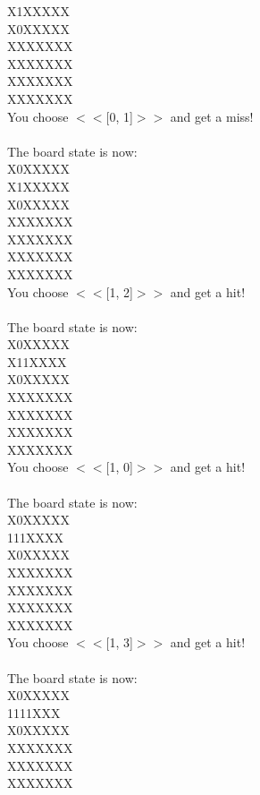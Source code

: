 \documentclass[pdflatex,sn-nature]{sn-jnl}%
\theoremstyle{thmstyleone}%
\theoremstyle{thmstyletwo}%
\theoremstyle{thmstylethree}%
\begin{document}
X1XXXXX $~$\\ 
X0XXXXX $~$\\ 
XXXXXXX $~$\\ 
XXXXXXX $~$\\ 
XXXXXXX $~$\\ 
XXXXXXX $~$\\ 
You choose $<<$[0, 1]$>>$ and get a miss! $~$\\ 
 $~$\\ 
The board state is now: $~$\\ 
X0XXXXX $~$\\ 
X1XXXXX $~$\\ 
X0XXXXX $~$\\ 
XXXXXXX $~$\\ 
XXXXXXX $~$\\ 
XXXXXXX $~$\\ 
XXXXXXX $~$\\ 
You choose $<<$[1, 2]$>>$ and get a hit! $~$\\ 
 $~$\\ 
The board state is now: $~$\\ 
X0XXXXX $~$\\ 
X11XXXX $~$\\ 
X0XXXXX $~$\\ 
XXXXXXX $~$\\ 
XXXXXXX $~$\\ 
XXXXXXX $~$\\ 
XXXXXXX $~$\\ 
You choose $<<$[1, 0]$>>$ and get a hit! $~$\\ 
 $~$\\ 
The board state is now: $~$\\ 
X0XXXXX $~$\\ 
111XXXX $~$\\ 
X0XXXXX $~$\\ 
XXXXXXX $~$\\ 
XXXXXXX $~$\\ 
XXXXXXX $~$\\ 
XXXXXXX $~$\\ 
You choose $<<$[1, 3]$>>$ and get a hit! $~$\\ 
 $~$\\ 
The board state is now: $~$\\ 
X0XXXXX $~$\\ 
1111XXX $~$\\ 
X0XXXXX $~$\\ 
XXXXXXX $~$\\ 
XXXXXXX $~$\\ 
XXXXXXX $~$\\ 
\end{document}
